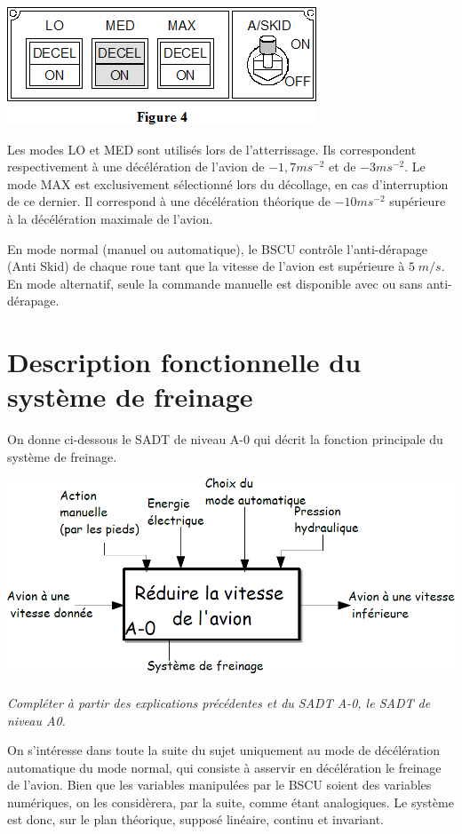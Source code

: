 \documentclass[10pt,oneside]{article}
\begin{document}
\begin{center}
\includegraphics[width=.4\textwidth]{png/image4.png}
\end{center}            

Les modes LO et MED sont utilisés lors de l’atterrissage. Ils correspondent
respectivement à une
décélération de l’avion de $-1,7 ms^{-2}$ et de $-3 ms^{-2}$. Le mode MAX est
exclusivement sélectionné lors du
décollage, en cas d’interruption de ce dernier. Il correspond à une décélération
théorique de $-10 ms^{-2}$
supérieure à la décélération maximale de l’avion.

En mode normal (manuel ou automatique), le BSCU contrôle l’anti-dérapage (Anti
Skid) de chaque roue
tant que la vitesse de l’avion est supérieure à $5\;m/s$.
En mode alternatif, seule la commande manuelle est disponible avec ou sans
anti-dérapage.
 

\section{Description fonctionnelle du système de freinage}

On donne ci-dessous le SADT de niveau A-0 qui décrit la fonction principale du système de freinage.

\begin{center}
\includegraphics[width=.5\textwidth]{png/image5.png}
\end{center}

\paragraph{}
\textit{Compléter à partir des explications précédentes et du SADT A-0, le SADT de niveau A0.}

On s'intéresse dans toute la suite du sujet uniquement au mode de décélération automatique du mode
normal, qui consiste à asservir en décélération le freinage de l'avion.
Bien que les variables manipulées par le BSCU soient des variables numériques, on les considèrera, par la
suite, comme étant analogiques. Le système est donc, sur le plan théorique, supposé linéaire, continu et
invariant.
\end{document}

